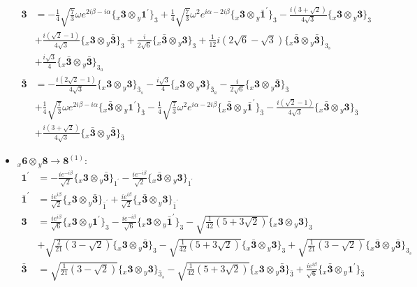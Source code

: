 \documentclass[english]{article}
\newcommand{\rep}[1]{\mathbf{#1}}
\newcommand{\repx}[2]{{}_{#2}\mathbf{#1}}
\newcommand{\subcg}[3]{\big\{ \repx{#1}{x}\otimes\repx{#2}{y}\big\}^{}_{#3}}
\begin{document}
\begin{itemize}
\begin{align*}
\\
\rep{3} & = -\frac{1}{4} \sqrt{\frac{7}{3}} \omega  e^{2 i \beta -i \alpha }\subcg{3}{1^{\prime}}{3}+\frac{1}{4} \sqrt{\frac{7}{3}} \omega ^2 e^{i \alpha -2 i \beta }\subcg{3}{\bar{1}^{\prime}}{3}-\frac{i \left(3+\sqrt{2}\right)}{4 \sqrt{3}}\subcg{3}{3}{3} \\ 
 & +\frac{i \left(\sqrt{2}-1\right)}{4 \sqrt{3}}\subcg{3}{\bar{3}}{3}+\frac{i}{2 \sqrt{6}}\subcg{\bar{3}}{3}{3}+\frac{1}{12} i \left(2 \sqrt{6}-\sqrt{3}\right)\subcg{\bar{3}}{\bar{3}}{3_{s}} \\ 
 & +\frac{i \sqrt{3}}{4}\subcg{\bar{3}}{\bar{3}}{3_{a}}
\\
\rep{\bar{3}} & = -\frac{i \left(2 \sqrt{2}-1\right)}{4 \sqrt{3}}\subcg{3}{3}{\bar{3}_{s}}-\frac{i \sqrt{3}}{4}\subcg{3}{3}{\bar{3}_{a}}-\frac{i}{2 \sqrt{6}}\subcg{3}{\bar{3}}{\bar{3}} \\ 
 & +\frac{1}{4} \sqrt{\frac{7}{3}} \omega  e^{2 i \beta -i \alpha }\subcg{\bar{3}}{1^{\prime}}{\bar{3}}-\frac{1}{4} \sqrt{\frac{7}{3}} \omega ^2 e^{i \alpha -2 i \beta }\subcg{\bar{3}}{\bar{1}^{\prime}}{\bar{3}}-\frac{i \left(\sqrt{2}-1\right)}{4 \sqrt{3}}\subcg{\bar{3}}{3}{\bar{3}} \\ 
 & +\frac{i \left(3+\sqrt{2}\right)}{4 \sqrt{3}}\subcg{\bar{3}}{\bar{3}}{\bar{3}}
\end{align*}
\item $\repx{6}{x}\otimes\repx{8}{y}\to\rep{8}^{(1)}$:
\begin{align*}
\rep{1^{\prime}} & = -\frac{i e^{-i \beta }}{\sqrt{2}}\subcg{3}{\bar{3}}{1^{\prime}}-\frac{i e^{-i \beta }}{\sqrt{2}}\subcg{\bar{3}}{3}{1^{\prime}}
\\
\rep{\bar{1}^{\prime}} & = \frac{i e^{i \beta }}{\sqrt{2}}\subcg{3}{\bar{3}}{\bar{1}^{\prime}}+\frac{i e^{i \beta }}{\sqrt{2}}\subcg{\bar{3}}{3}{\bar{1}^{\prime}}
\\
\rep{3} & = \frac{i e^{i \beta }}{\sqrt{6}}\subcg{3}{1^{\prime}}{3}-\frac{i e^{-i \beta }}{\sqrt{6}}\subcg{3}{\bar{1}^{\prime}}{3}-\sqrt{\frac{1}{42} \left(5+3 \sqrt{2}\right)}\subcg{3}{3}{3} \\ 
 & +\sqrt{\frac{2}{21} \left(3-\sqrt{2}\right)}\subcg{3}{\bar{3}}{3}-\sqrt{\frac{1}{42} \left(5+3 \sqrt{2}\right)}\subcg{\bar{3}}{3}{3}+\sqrt{\frac{1}{21} \left(3-\sqrt{2}\right)}\subcg{\bar{3}}{\bar{3}}{3_{s}}
\\
\rep{\bar{3}} & = \sqrt{\frac{1}{21} \left(3-\sqrt{2}\right)}\subcg{3}{3}{\bar{3}_{s}}-\sqrt{\frac{1}{42} \left(5+3 \sqrt{2}\right)}\subcg{3}{\bar{3}}{\bar{3}}+\frac{i e^{i \beta }}{\sqrt{6}}\subcg{\bar{3}}{1^{\prime}}{\bar{3}} \\ 

\end{align*}
\end{itemize}
\end{document}

